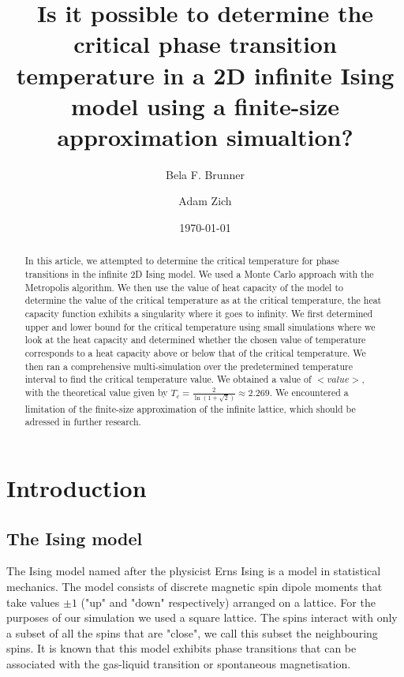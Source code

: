 \documentclass[twocolumn,a4paper,aps,amsmath,amssymb,floatfix,superscriptaddress]{revtex4-2}
\begin{document}
\title{Is it possible to determine the critical phase transition temperature in a 2D infinite Ising model using a finite-size approximation simualtion?}
        
\author{Bela F. Brunner}

\author{Adam Zich}

\date{\today}

\begin{abstract}
    In this article, we attempted to determine the critical temperature for phase transitions in the infinite 2D Ising model. We used a Monte Carlo approach with the Metropolis algorithm. We then use the value of heat capacity of the model to determine the value of the critical temperature as at the critical temperature, the heat capacity function exhibits a singularity where it goes to infinity\cite{Onsager1944}. We first determined upper and lower bound for the critical temperature using small simulations where we look at the heat capacity and determined whether the chosen value of temperature corresponds to a heat capacity above or below that of the critical temperature. We then ran a comprehensive multi-simulation over the predetermined temperature interval to find the critical temperature value. We obtained a value of $<value>$, with the theoretical value given by $T_c = \frac{2}{\ln(1 + \sqrt{2})} \approx 2.269$. We encountered a limitation of the finite-size approximation of the infinite lattice, which should be adressed in further research.
\end{abstract}

\maketitle

\section{Introduction}\label{intro}
    \subsection{The Ising model}
        The Ising model named after the physicist Erns Ising is a model in statistical mechanics. The model consists of discrete magnetic spin dipole moments that take values $\pm 1$ ("up" and "down" respectively) arranged on a lattice. For the purposes of our simulation we used a square lattice. The spins interact with only a subset of all the spins that are "close", we call this subset the neighbouring spins. It is known that this model exhibits phase transitions that can be associated with the gas-liquid transition or spontaneous magnetisation. \cite{Blundell2010}
\end{document}
